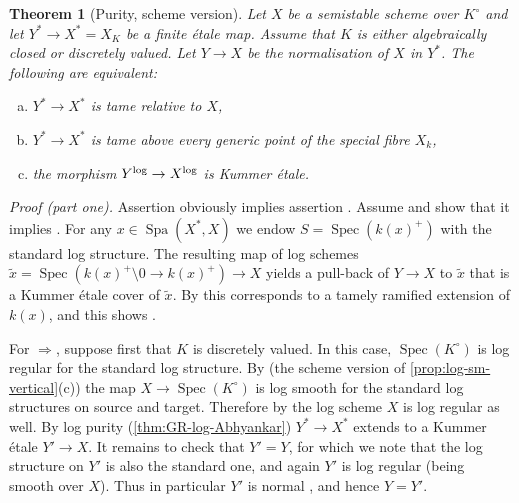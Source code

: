 \documentclass[a4paper,twoside,11pt,reqno]{amsart}
\DeclareMathOperator{\Spec}{Spec}
\DeclareMathOperator{\Spa}{Spa}
\newtheorem{thm}{Theorem}[subsection]
\theoremstyle{definition}
\numberwithin{equation}{subsection}
\begin{document}
\begin{thm}[Purity, scheme version] \label{thm:scheme-Abhyankar}
  Let $X$ be a semistable scheme over $K^\circ$ and let $Y^*\to X^* = X_K$ be a finite \'etale map.  Assume that $K$ is either algebraically closed or discretely valued. 
 Let $Y\to X$ be the normalisation of $X$ in $Y^*$. The following are equivalent:
  \begin{enumerate}[(a)]
    \item \label{propitem:Abhy-tame} 
        $Y^*\to X^*$ is tame relative to $X$,
    \item \label{propitem:Abhy-tame-boundary}
        $Y^*\to X^*$ is tame above every generic point of the special fibre $X_k$,
    \item \label{propitem:Abhy-ket}
        the morphism $Y^{\rm log}\to X^{\rm log}$ is Kummer \'etale.
  \end{enumerate}
\end{thm}

\noindent\emph{Proof (part one).} 
\label{proof:scheme-Abhyankar}
Assertion  obviously implies assertion . Assume  and show that it implies . For any $x \in \Spa(X^*,X)$ we endow $S = \Spec(k(x)^+)$ with the standard log structure. The resulting  map of log schemes $\tilde{x} = \Spec(k(x)^+ \setminus 0 \to k(x)^+) \to X$ yields a pull-back of $Y \to X$ to $\tilde{x}$ that is a Kummer \'etale cover of $\tilde{x}$.
By  \cite[Corollary 4.4.9]{AHLS-Log} this corresponds to a tamely ramified extension of $k(x)$, and this shows .

For $\Rightarrow$, suppose first that $K$ is discretely valued. In this case, $\Spec(K^\circ)$ is log regular for the standard log structure. By \cite[Corollary~5.3.7]{AHLS-Log} (the scheme version of  \cref{prop:log-sm-vertical}(c)) the map $X\to \Spec(K^\circ)$ is log smooth for the standard log structures on source and target. Therefore by \cite[Theorem~8.2]{KatoToricSingularities} the log scheme $X$ is log regular as well. By log purity (\cref{thm:GR-log-Abhyankar}) $Y^*\to X^*$ extends to a Kummer \'etale $Y'\to X$. It remains to check that $Y'=Y$, for which we note that the log structure on $Y'$ is also the standard one, and again $Y'$ is log regular (being smooth over $X$). Thus in particular $Y'$ is normal \cite[Theorem~4.1]{KatoToricSingularities}, and hence $Y=Y'$.
\end{document}
